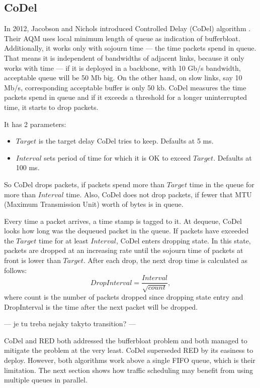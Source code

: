 \subsection{CoDel}
\label{CoDel}
In 2012, Jacobson and Nichols introduced Controlled Delay (CoDel) algorithm \cite{CoDel}. Their AQM uses local minimum length of queue as indication of bufferbloat. Additionally, it works only with sojourn time --- the time packets spend in queue. That means it is independent of bandwidths of adjacent links, because it only works with time --- if it is deployed in a backbone, with 10 Gb/s bandwidth, acceptable queue will be 50 Mb big. On the other hand, on slow links, say 10 Mb/s, corresponding acceptable buffer is only 50 kb. CoDel measures the time packets spend in queue and if it exceeds a threshold for a longer uninterrupted time, it starts to drop packets.

It has 2 parameters:
\begin{itemize}
	\item $Target$ is the target delay CoDel tries to keep. Defaults at 5 ms.
	\item $Interval$ sets period of time for which it is OK to exceed $Target$. Defaults at 100 ms.
\end{itemize}
So CoDel drops packets, if packets spend more than $Target$ time in the queue for more than $Interval$ time. Also, CoDel does not drop packets, if fewer that MTU (Maximum Transmission Unit) worth of bytes is in queue.

Every time a packet arrives, a time stamp is tagged to it. At dequeue, CoDel looks how long was the dequeued packet in the queue. If packets have exceeded the $Target$ time for at least $Interval$, CoDel enters dropping state. In this state, packets are dropped at an increasing rate until the sojourn time of packets at front is lower than $Target$. After each drop, the next drop time is calculated as follows:
\[
  DropInterval = \frac{Interval}{\sqrt{count}},
\]
where count is the number of packets dropped since dropping state entry and DropInterval is the time after the next packet will be dropped.

--- je tu treba nejaky takyto transition? ---
 
CoDel and RED both addressed the bufferbloat problem and both managed to mitigate the problem at the very least. CoDel superseded RED by its easiness to deploy. However, both algorithms work above a single FIFO queue, which is their limitation. The next section shows how traffic scheduling may benefit from using multiple queues in parallel.

